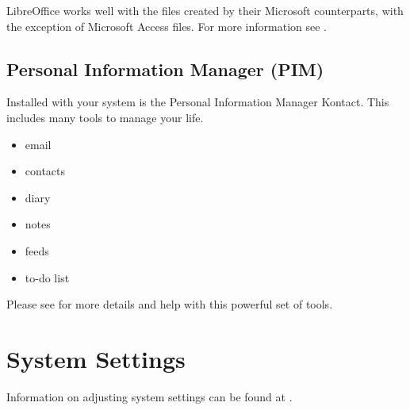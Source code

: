 \documentclass[letterpaper,10pt,english]{sphinxmanual}
\begin{document}
LibreOffice works well with the files created by their Microsoft counterparts, with the exception of Microsoft Access files. For more information see .


\subsection{Personal Information Manager (PIM)}
\label{\detokenize{docs/software:personal-information-manager-pim}}
Installed with your system is the  Personal Information Manager Kontact. This includes many tools to manage your life.
\begin{itemize}
\item {} 
email

\item {} 
contacts

\item {} 
diary

\item {} 
notes

\item {} 
feeds

\item {} 
to-do list

\end{itemize}

Please see  for more details and help with this powerful set of tools.


\section{System Settings}
\label{\detokenize{docs/software:system-settings}}
Information on adjusting system settings can be found at .
\end{document}
